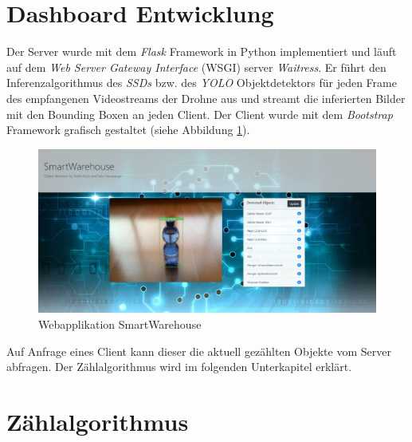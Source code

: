 \section{Dashboard Entwicklung}

Der Server wurde mit dem \textit{Flask} Framework in Python implementiert und läuft auf dem \textit{Web Server Gateway Interface} (WSGI) server \textit{Waitress}. Er führt den Inferenzalgorithmus des \textit{SSDs} bzw. des \textit{YOLO} Objektdetektors für jeden Frame des empfangenen Videostreams der Drohne aus und streamt die inferierten Bilder mit den Bounding Boxen an jeden Client. Der Client wurde mit dem \textit{Bootstrap} Framework grafisch gestaltet (siehe Abbildung \ref{webapp}).

\begin{figure}[H]
	\begin{center}
		\includegraphics[width=15cm]{Bilder/webapp.jpeg} 
		\caption[Webapplikation SmartWarehouse]{Webapplikation SmartWarehouse}
		\label{webapp}
	\end{center}
\end{figure}

Auf Anfrage eines Client kann dieser die aktuell gezählten Objekte vom Server abfragen. Der Zählalgorithmus wird im folgenden Unterkapitel erklärt. 

\section{Zählalgorithmus}



